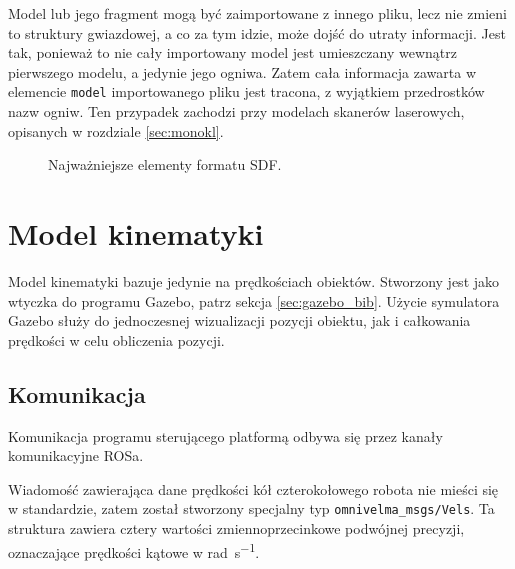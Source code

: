 	Model lub jego fragment mogą być zaimportowane z innego pliku, lecz nie zmieni to struktury gwiazdowej, a co za tym idzie, może dojść do utraty informacji.
	Jest tak, ponieważ to nie cały importowany model jest umieszczany wewnątrz pierwszego modelu, a jedynie jego ogniwa. 
	Zatem cała informacja zawarta w elemencie \texttt{model} importowanego pliku jest tracona, z wyjątkiem przedrostków nazw ogniw.
	Ten przypadek zachodzi przy modelach skanerów laserowych, opisanych w rozdziale \ref{sec:monokl}.

	\begin{figure}[h]
	\caption{Najważniejsze elementy formatu SDF.}
	\label{fig:sdf_dir}
	\end{figure} 
	
\section{Model kinematyki}
	Model kinematyki bazuje jedynie na prędkościach obiektów.
	Stworzony jest jako wtyczka do programu Gazebo, patrz sekcja \ref{sec:gazebo_bib}.
	Użycie symulatora Gazebo służy do jednoczesnej wizualizacji pozycji obiektu, jak i całkowania prędkości w celu obliczenia pozycji.
	
	\subsection{Komunikacja}
		Komunikacja programu sterującego platformą odbywa się przez kanały komunikacyjne ROSa.

		Wiadomość zawierająca dane prędkości kół czterokołowego robota nie mieści się w standardzie, zatem został stworzony specjalny typ \texttt{omnivelma\_msgs/Vels}.
		Ta struktura zawiera cztery wartości zmiennoprzecinkowe podwójnej precyzji, oznaczające prędkości kątowe w \si{\radian\per\second}.

